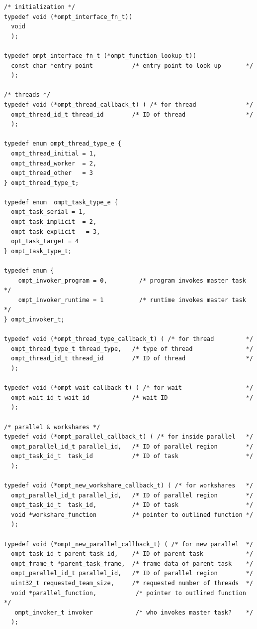 \documentclass{article}
\begin{document}
\begin{verbatim}
/* initialization */
typedef void (*ompt_interface_fn_t)(
  void
  );

typedef ompt_interface_fn_t (*ompt_function_lookup_t)(
  const char *entry_point           /* entry point to look up       */
  );

/* threads */	
typedef void (*ompt_thread_callback_t) ( /* for thread              */	   
  ompt_thread_id_t thread_id        /* ID of thread                 */
  );
  
typedef enum ompt_thread_type_e {
  ompt_thread_initial = 1,
  ompt_thread_worker  = 2,
  ompt_thread_other   = 3
} ompt_thread_type_t;

typedef enum  ompt_task_type_e {
  ompt_task_serial = 1,
  ompt_task_implicit  = 2,
  ompt_task_explicit   = 3,
  opt_task_target = 4
} ompt_task_type_t;

typedef enum {
    ompt_invoker_program = 0,         /* program invokes master task  */
    ompt_invoker_runtime = 1          /* runtime invokes master task  */
} ompt_invoker_t;

typedef void (*ompt_thread_type_callback_t) ( /* for thread         */
  ompt_thread_type_t thread_type,   /* type of thread               */	   
  ompt_thread_id_t thread_id        /* ID of thread                 */
  );
	
typedef void (*ompt_wait_callback_t) ( /* for wait                  */
  ompt_wait_id_t wait_id            /* wait ID                      */
  );
	
/* parallel & workshares */
typedef void (*ompt_parallel_callback_t) ( /* for inside parallel   */			   
  ompt_parallel_id_t parallel_id,   /* ID of parallel region        */
  ompt_task_id_t  task_id           /* ID of task                   */
  );								    

typedef void (*ompt_new_workshare_callback_t) ( /* for workshares   */			   
  ompt_parallel_id_t parallel_id,   /* ID of parallel region        */
  ompt_task_id_t  task_id,          /* ID of task                   */
  void *workshare_function          /* pointer to outlined function */
  );								    
							   	    
typedef void (*ompt_new_parallel_callback_t) ( /* for new parallel  */
  ompt_task_id_t parent_task_id,    /* ID of parent task            */
  ompt_frame_t *parent_task_frame,  /* frame data of parent task    */
  ompt_parallel_id_t parallel_id,   /* ID of parallel region        */
  uint32_t requested_team_size,     /* requested number of threads  */
  void *parallel_function,           /* pointer to outlined function */
   ompt_invoker_t invoker            /* who invokes master task?    */
  );
  

\end{verbatim}
\end{document}
